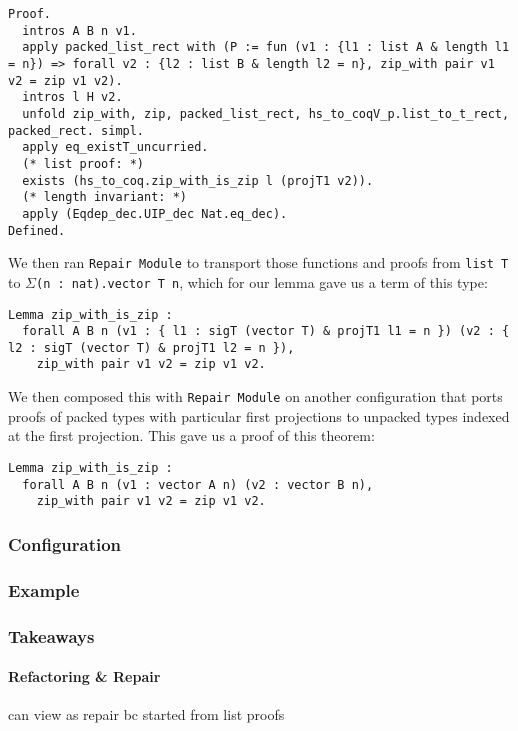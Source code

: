 \begin{lstlisting}
Proof.
  intros A B n v1. 
  apply packed_list_rect with (P := fun (v1 : {l1 : list A & length l1 = n}) => forall v2 : {l2 : list B & length l2 = n}, zip_with pair v1 v2 = zip v1 v2).
  intros l H v2.
  unfold zip_with, zip, packed_list_rect, hs_to_coqV_p.list_to_t_rect, packed_rect. simpl.
  apply eq_existT_uncurried.
  (* list proof: *)
  exists (hs_to_coq.zip_with_is_zip l (projT1 v2)).
  (* length invariant: *)
  apply (Eqdep_dec.UIP_dec Nat.eq_dec).
Defined.
\end{lstlisting}
We then ran \lstinline{Repair Module} to transport those functions and proofs from \lstinline{list T}
to $\Sigma$\lstinline{(n : nat).vector T n}, which for our lemma gave us a term of this type:

\begin{lstlisting}
Lemma zip_with_is_zip :
  forall A B n (v1 : { l1 : sigT (vector T) & projT1 l1 = n }) (v2 : { l2 : sigT (vector T) & projT1 l2 = n }),
    zip_with pair v1 v2 = zip v1 v2.
\end{lstlisting}
We then composed this with \lstinline{Repair Module} on another configuration that ports proofs of
packed types with particular first projections to unpacked types indexed at the first projection.
This gave us a proof of this theorem:

\begin{lstlisting}
Lemma zip_with_is_zip :
  forall A B n (v1 : vector A n) (v2 : vector B n),
    zip_with pair v1 v2 = zip v1 v2.
\end{lstlisting}

\subsubsection{Configuration}

\subsubsection{Example}

\subsubsection{Takeaways}

\paragraph{Refactoring \& Repair}
can view as repair bc started from list proofs

